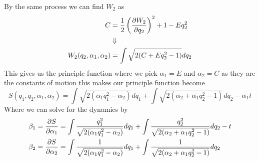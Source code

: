 \documentclass[11pt]{article}
\numberwithin{equation}{section}
\begin{document}
By the same process we can find $W_2$ as
\begin{align*}
C &= \frac{1}{2}\left(\frac{\partial{W_2}}{\partial{q_2}}\right)^2 + 1 - Eq_2^2\\
&\Downarrow\\
W_2(q_2,\alpha_1,\alpha_2) &= \int\sqrt{2(C + Eq_2^2-1)}dq_2
\end{align*}
This gives us the principle function where we pick $\alpha_1=E$ and $\alpha_2=C$ as 
they are the constants of motion this makes our principle function become
$$S(q_1,q_2,\alpha_1,\alpha_2) = \int\sqrt{2(\alpha_1q_1^2 - \alpha_2)}dq_1 + \int\sqrt{2(\alpha_2 + \alpha_1q_2^2-1)}dq_2 - \alpha_1t$$
Where we can solve for the dynamics by
\begin{align*}
\beta_1 = \frac{\partial{S}}{\partial{\alpha_1}} &= \int\frac{q_1^2}{\sqrt{2(\alpha_1q_1^2 - \alpha_2)}}dq_1 + \int\frac{q_2^2}{\sqrt{2(\alpha_2 + \alpha_1q_2^2-1)}}dq_2 - t\\
\beta_2 = \frac{\partial{S}}{\partial{\alpha_2}} &= \int\frac{1}{\sqrt{2(\alpha_1q_1^2 - \alpha_2)}}dq_1 + \int\frac{1}{\sqrt{2(\alpha_2 + \alpha_1q_2^2-1)}}dq_2 
\end{align*}
\end{document}
